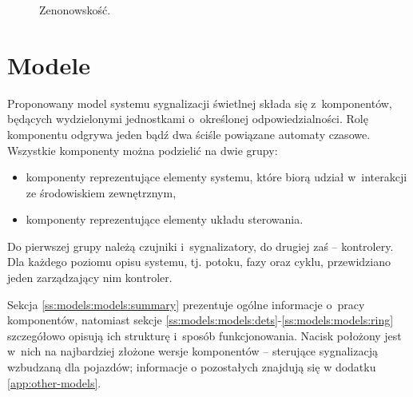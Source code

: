 \documentclass{pracamgr}
\theoremstyle{plain}
\begin{document}
\begin{figure}
  \centering
  \hspace{1in}
  \caption{Zenonowskość.}
  \label{img:models-zeno}
\end{figure}

\section{Modele}
\label{s:models:models}
Proponowany model systemu sygnalizacji świetlnej składa się
z~komponentów, będących wydzielonymi jednostkami o~określonej
odpowiedzialności. Rolę komponentu odgrywa jeden bądź dwa ściśle
powiązane automaty czasowe. Wszystkie komponenty można podzielić na
dwie grupy:
\begin{itemize}
  \item komponenty reprezentujące elementy systemu, które biorą udział
  w~interakcji ze środowiskiem zewnętrznym,
  \item komponenty reprezentujące elementy układu sterowania.
\end{itemize}
Do pierwszej grupy należą czujniki i~sygnalizatory, do drugiej zaś --
kontrolery. Dla każdego poziomu opisu systemu, tj. potoku, fazy oraz
cyklu, przewidziano jeden zarządzający nim kontroler.

Sekcja \ref{ss:models:models:summary} prezentuje ogólne informacje
o~pracy komponentów, natomiast sekcje
\ref{ss:models:models:dets}-\ref{ss:models:models:ring} szczegółowo
opisują ich strukturę i~sposób funkcjonowania. Nacisk położony jest
w~nich na najbardziej złożone wersje komponentów -- sterujące
sygnalizacją wzbudzaną dla pojazdów; informacje o pozostałych znajdują
się w dodatku \ref{app:other-models}.
\end{document}
